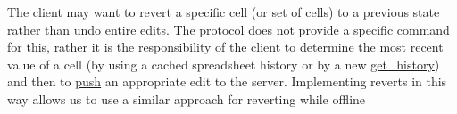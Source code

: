 
The client may want to revert a specific cell (or set of cells) to a previous 
state rather than undo entire edits. The protocol does not provide a specific 
command for this, rather it is the responsibility of the client to determine 
the most recent value of a cell (by using a cached spreadsheet history or by 
a new \hyperref[lst:command:get_history]{get\_history}) and then to \hyperref[lst:command:push]{push} 
an appropriate edit to the server. 
Implementing reverts in this way allows us to use a similar approach for 
reverting while offline